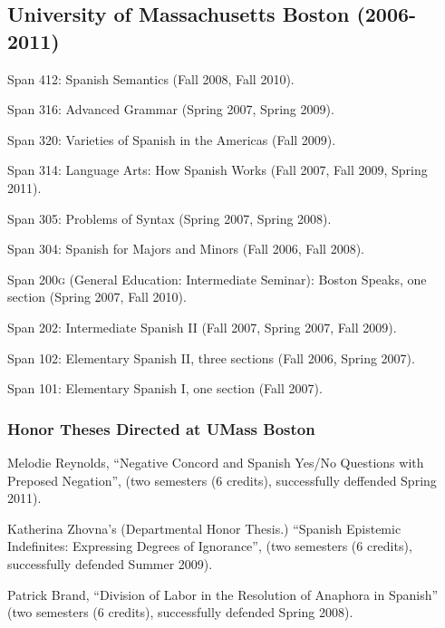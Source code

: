 \documentclass[11pt]{article}
\begin{document}
 

\subsection*{University of Massachusetts Boston (2006-2011)}


Span 412: Spanish Semantics (Fall 2008, Fall 2010).

Span 316: Advanced Grammar (Spring 2007, Spring 2009).

Span 320: Varieties of Spanish in the Americas (Fall 2009).

Span 314: Language Arts: How Spanish Works (Fall 2007, Fall 2009,
Spring 2011).

Span 305: Problems of Syntax (Spring 2007, Spring 2008).

Span 304: Spanish for Majors and Minors (Fall 2006, Fall 2008).

Span 200\textsc{g} (General Education: Intermediate Seminar): Boston
Speaks, one section (Spring 2007, Fall 2010).

Span 202: Intermediate Spanish II  (Fall 2007, Spring 2007, Fall
2009).

Span 102: Elementary Spanish II,  three sections (Fall 2006, Spring
2007).

Span 101: Elementary Spanish I, one section (Fall 2007).	

 \subsubsection*{Honor Theses Directed at UMass Boston}

 Melodie Reynolds, ``Negative Concord and
Spanish Yes/No Questions with Preposed Negation'', (two semesters (6
credits), successfully deffended Spring 2011).

 Katherina Zhovna's (Departmental Honor
  Thesis.)  ``Spanish Epistemic Indefinites: Expressing
  Degrees of Ignorance'', (two semesters (6 credits), successfully defended Summer 2009).

 Patrick Brand, ``Division of
  Labor in the Resolution of Anaphora in Spanish''  (two semesters (6 credits), successfully
  defended Spring 2008).




\end{document}
